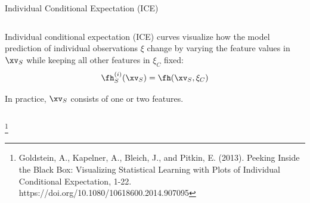 \documentclass[11pt,compress,t,notes=noshow, xcolor=table]{beamer}
\begin{document}
\begin{vbframe}{Individual Conditional Expectation (ICE)}
\begin{columns}[T]
\begin{column}{0.82\textwidth}
Individual conditional expectation (ICE) curves visualize how the model prediction of individual observations $\xi$
change by varying the feature values in $\xv_S$ while keeping all other features in $\xi_C$ fixed:
$$\fh_{S}^{(i)}(\xv_S) = \fh(\xv_S, \xi_C)$$

In practice, $\xv_S$ consists of one or two features.
\end{column}
\end{columns}



%
\footnote[frame]{Goldstein, A., Kapelner, A., Bleich, J., and Pitkin, E. (2013). Peeking Inside the Black Box: Visualizing Statistical Learning with Plots of Individual Conditional Expectation, 1-22. https://doi.org/10.1080/10618600.2014.907095}
\end{vbframe}

%
%
%
\end{document}
